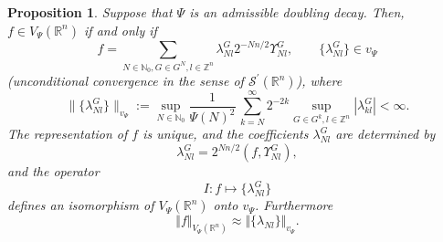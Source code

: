 \documentclass[11pt, a4paper,leqno]{amsart}
\theoremstyle{plain}
\newtheorem{proposition}{Proposition}
\numberwithin{equation}{section}
\theoremstyle{definition}
\theoremstyle{remark}
\begin{document}
\begin{proposition}
\label{PropositionWavelet} Suppose that $\Psi$ is an admissible doubling decay. Then, $f\in V_{\Psi}(\mathbb{R}^{n})$ if and only
if
\begin{equation}
f=\sum_{N\in\mathbb{N}_{0},G\in G^{N},l\in\mathbb{Z}^{n}}\lambda_{N l}%
^{G}2^{-Nn/2}\Upsilon_{N l}^{G},\qquad\{\lambda_{N l}^{G}\}\in v_{\Psi}
\label{PropositionWavelet1}%
\end{equation}
(unconditional convergence in the sense of $\mathcal{S}^{\prime}%
(\mathbb{R}^{n})$), where
	$$
		\|\{\lambda^{G}_{N l}\}\|_{v_\Psi} := \sup_{N \in \mathbb{N}_0} \frac{1}{\Psi(N)^2} \, \sum_{k=N}^\infty 2^{- 2 k} \sup_{G \in G^k, l \in \mathbb{Z}^n} |\lambda^{G}_{k l}| < \infty. 
	$$
 The representation of $f$ is unique, and the coefficients
$\lambda_{N l}^{G}$ are determined by
\begin{equation}
\lambda_{N l}^{G}=2^{Nn/2}(f,\Upsilon_{N l}^{G}), \label{PropositionWavelet2}%
\end{equation}
and the operator
\begin{equation}
I:f\mapsto\{\lambda_{N l}^{G}\} \label{OperI}%
\end{equation}
defines an isomorphism of $V_{\Psi}(\mathbb{R}^{n})$ onto $v_{\Psi}$. Furthermore
\begin{equation}
\Vert f\Vert_{V_{\Psi}(\mathbb{R}^{n})}\approx\Vert\{\lambda_{N l}
\}\Vert_{v_{\Psi}}.\label{vanilla}%
\end{equation}
\end{proposition}
\end{document}
